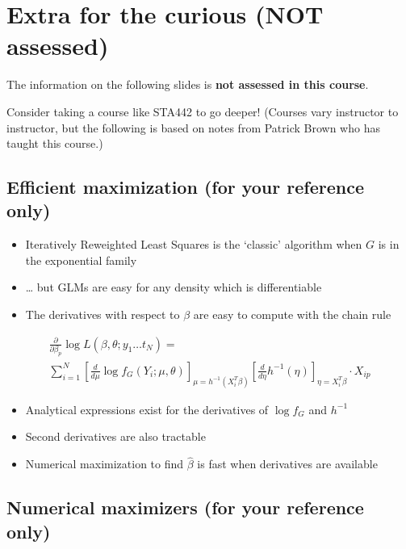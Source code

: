 \documentclass[
  openany]{book}
\providecommand{\tightlist}{%
  \setlength{\itemsep}{0pt}\setlength{\parskip}{0pt}}
\begin{document}
\hypertarget{extra-for-the-curious-not-assessed}{%
\section{Extra for the curious (NOT assessed)}\label{extra-for-the-curious-not-assessed}}

The information on the following slides is \textbf{not assessed in this
course}.

Consider taking a course like STA442 to go deeper! (Courses vary instructor to instructor, but the following is based on notes from Patrick Brown who has taught this course.)

\hypertarget{efficient-maximization-for-your-reference-only}{%
\subsection{Efficient maximization (for your reference only)}\label{efficient-maximization-for-your-reference-only}}

\begin{itemize}
\tightlist
\item
  Iteratively Reweighted Least Squares is the `classic' algorithm when
  \(G\) is in the exponential family
\item
  \ldots{} but GLMs are easy for any density which is differentiable
\item
  The derivatives with respect to \(\beta\) are easy to compute with the
  chain rule
\end{itemize}

\begin{multline*}
\frac{\partial}{\partial \beta_p} \log L(\beta, \theta ; y_1 \ldots t_N) = \\
   \sum_{i=1}^N \left[\frac{d}{d \mu} \log f_G (Y_i; \mu, \theta)
\right]_{\mu = h^{-1}(X_i^T\beta)} 
\left[ 
\frac{d}{d \eta}h^{-1}(\eta)
\right]_{\eta = X_i^T\beta} \cdot X_{ip}
\end{multline*}

\begin{itemize}
\tightlist
\item
  Analytical expressions exist for the derivatives of \(\log f_G\) and
  \(h^{-1}\)
\item
  Second derivatives are also tractable
\item
  Numerical maximization to find \(\hat\beta\) is fast when derivatives
  are available
\end{itemize}

\hypertarget{numerical-maximizers-for-your-reference-only}{%
\subsection{Numerical maximizers (for your reference only)}\label{numerical-maximizers-for-your-reference-only}}
\end{document}
